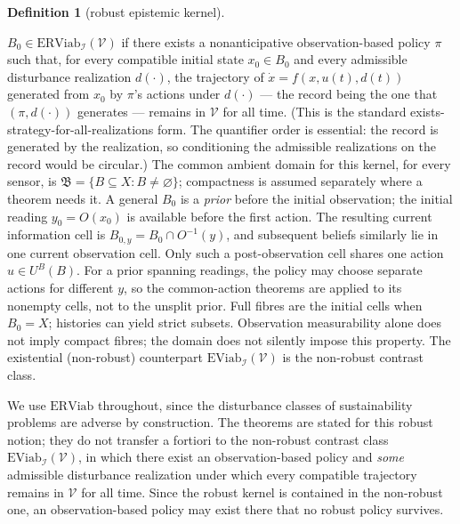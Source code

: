 \documentclass[10pt,twocolumn]{article}
\theoremstyle{definition}
\newtheorem{definition}{Definition}
\begin{document}
\begin{definition}[robust epistemic kernel]\label{calc-def:kernel}

\(B_0 \in \mathrm{ERViab}_{\mathcal{I}}(\mathcal{V})\) if there exists a
nonanticipative observation-based policy \(\pi\) such that, for every
compatible initial state \(x_0 \in B_0\) and every admissible
disturbance realization \(d(\cdot)\), the trajectory of
\(\dot x = f(x, u(t), d(t))\) generated from \(x_0\) by \(\pi\)'s
actions under \(d(\cdot)\) --- the record being the one that
\((\pi, d(\cdot))\) generates --- remains in \(\mathcal{V}\) for all
time. (This is the standard exists-strategy-for-all-realizations form. The quantifier order is essential: the record is generated by the realization, so conditioning the admissible realizations on the record would be circular.) The common ambient domain for this kernel, for every sensor, is
\(\mathfrak B=\{B\subseteq X:B\neq\varnothing\}\); compactness is
assumed separately where a theorem needs it. A general \(B_0\) is a
\emph{prior} before the initial observation; the initial reading
\(y_0=O(x_0)\) is available before the first action. The resulting
current information cell is \(B_{0,y}=B_0\cap O^{-1}(y)\), and
subsequent beliefs similarly lie in one current observation cell.
Only such a post-observation cell shares one action \(u\in U^B(B)\).
For a prior spanning readings, the policy may choose separate actions
for different \(y\), so the common-action theorems are applied to its
nonempty cells, not to the unsplit prior. Full fibres are the initial
cells when \(B_0=X\); histories can yield strict subsets. Observation
measurability alone does not imply compact fibres; the domain does not
silently impose this property. The existential (non-robust) counterpart \(\mathrm{EViab}_{\mathcal{I}}(\mathcal{V})\) is the non-robust contrast class.

\end{definition}

We use \(\mathrm{ERViab}\) throughout, since the disturbance classes of sustainability problems are adverse by construction. The theorems are stated for this robust notion; they do not transfer a fortiori to the non-robust contrast class \(\mathrm{EViab}_{\mathcal{I}}(\mathcal{V})\), in which there exist an observation-based policy and \emph{some} admissible disturbance realization under which every compatible trajectory remains in \(\mathcal{V}\) for all time. Since the robust kernel is contained in the non-robust one, an observation-based policy may exist there that no robust policy survives.
\end{document}
